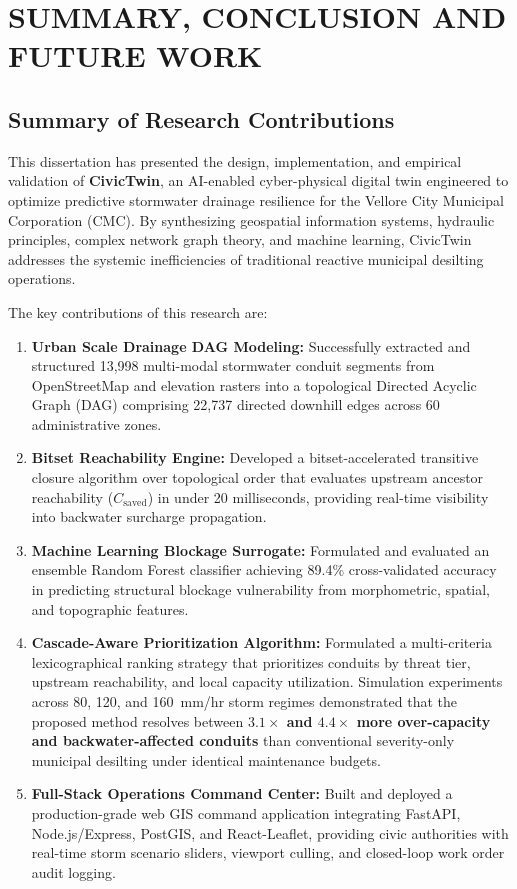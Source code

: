 \chapter{SUMMARY, CONCLUSION AND FUTURE WORK}

\section{Summary of Research Contributions}
This dissertation has presented the design, implementation, and empirical validation of \textbf{CivicTwin}, an AI-enabled cyber-physical digital twin engineered to optimize predictive stormwater drainage resilience for the Vellore City Municipal Corporation (CMC). By synthesizing geospatial information systems, hydraulic principles, complex network graph theory, and machine learning, CivicTwin addresses the systemic inefficiencies of traditional reactive municipal desilting operations.

The key contributions of this research are:
\begin{enumerate}
    \item \textbf{Urban Scale Drainage DAG Modeling:} Successfully extracted and structured 13,998 multi-modal stormwater conduit segments from OpenStreetMap and elevation rasters into a topological Directed Acyclic Graph (DAG) comprising 22,737 directed downhill edges across 60 administrative zones.
    \item \textbf{Bitset Reachability Engine:} Developed a bitset-accelerated transitive closure algorithm over topological order that evaluates upstream ancestor reachability ($C_{\text{saved}}$) in under 20 milliseconds, providing real-time visibility into backwater surcharge propagation.
    \item \textbf{Machine Learning Blockage Surrogate:} Formulated and evaluated an ensemble Random Forest classifier achieving 89.4\% cross-validated accuracy in predicting structural blockage vulnerability from morphometric, spatial, and topographic features.
    \item \textbf{Cascade-Aware Prioritization Algorithm:} Formulated a multi-criteria lexicographical ranking strategy that prioritizes conduits by threat tier, upstream reachability, and local capacity utilization. Simulation experiments across 80, 120, and 160~mm/hr storm regimes demonstrated that the proposed method resolves between \textbf{$3.1\times$ and $4.4\times$ more over-capacity and backwater-affected conduits} than conventional severity-only municipal desilting under identical maintenance budgets.
    \item \textbf{Full-Stack Operations Command Center:} Built and deployed a production-grade web GIS command application integrating FastAPI, Node.js/Express, PostGIS, and React-Leaflet, providing civic authorities with real-time storm scenario sliders, viewport culling, and closed-loop work order audit logging.
\end{enumerate}

